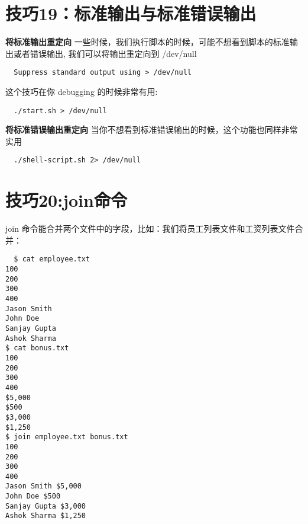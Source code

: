 \documentclass[UTF8]{ctexart}
\begin{document}
\section*{技巧19：标准输出与标准错误输出}
\textbf{将标准输出重定向} \newline
一些时候，我们执行脚本的时候，可能不想看到脚本的标准输出或者错误输出,
我们可以将输出重定向到 /dev/null
\begin{lstlisting}
  Suppress standard output using > /dev/null
\end{lstlisting}
这个技巧在你 debugging 的时候非常有用:
\begin{lstlisting}
  ./start.sh > /dev/null
\end{lstlisting}
\textbf{将标准错误输出重定向} \newline
当你不想看到标准错误输出的时候，这个功能也同样非常实用
\begin{lstlisting}
  ./shell-script.sh 2> /dev/null
\end{lstlisting}


\section*{技巧20:join命令}
join 命令能合并两个文件中的字段，比如：我们将员工列表文件和工资列表文件合并：
\begin{lstlisting}
  $ cat employee.txt
100
200
300
400
Jason Smith
John Doe
Sanjay Gupta
Ashok Sharma
$ cat bonus.txt
100
200
300
400
$5,000
$500
$3,000
$1,250
$ join employee.txt bonus.txt
100
200
300
400
Jason Smith $5,000
John Doe $500
Sanjay Gupta $3,000
Ashok Sharma $1,250
\end{lstlisting}
\end{document}
